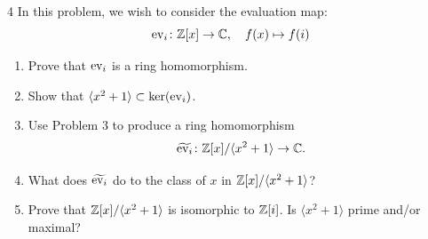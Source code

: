 \documentclass[Notebook.tex]{subfiles}
\begin{document}
\newpage 


\begin{problem}{4}
In this problem, we wish to consider the evaluation map: 
    \[
    \operatorname{ev}_i \colon \mathbb Z[x] \to \mathbb C,
    \quad
    f(x)\mapsto f(i)
    \]
    \begin{enumerate}[label=(\alph*),ref=\theenumi\alph*]
        \item Prove that $\operatorname{ev}_{i}$ is a ring homomorphism.

        \item Show that $\langle x^2+1 \rangle \subset \ker(\operatorname{ev}_i)$.

        \item Use Problem 3 to produce a ring homomorphism
        \[
        \widetilde{\operatorname{ev}_i}\colon \mathbb Z[x]/\langle x^2+ 1\rangle \to \mathbb C.
        \]

        \item What does $\widetilde{\operatorname{ev}_i}$ do to the class of $x$ in $\mathbb Z[x]/\langle x^2 +1\rangle$?
        
        \item Prove that $\mathbb Z[x]/\langle x^2+1\rangle$ is isomorphic to $\mathbb Z[i]$. Is $\langle x^2 +1\rangle$ prime and/or maximal?
    \end{enumerate}
\end{problem}
\end{document}
